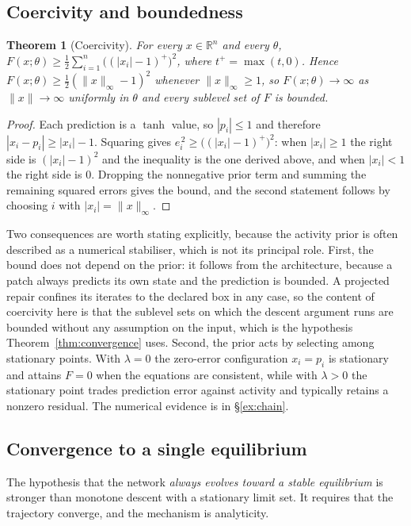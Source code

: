 \documentclass[11pt]{article}
\newtheorem{theorem}{Theorem}
\theoremstyle{definition}
\theoremstyle{remark}
\newcommand{\R}{\mathbb{R}}
\begin{document}
\subsection{Coercivity and boundedness}
\label{sec:coercive}
\begin{theorem}[Coercivity]
\label{thm:coercive}
For every $x\in\R^n$ and every $\theta$,
$F(x;\theta)\ge\tfrac12\sum_{i=1}^{n}\big((|x_i|-1)^+\big)^2$, where $t^+=\max(t,0)$. Hence
$F(x;\theta)\ge\tfrac12(\|x\|_\infty-1)^2$ whenever $\|x\|_\infty\ge1$, so $F(x;\theta)\to\infty$ as
$\|x\|\to\infty$ uniformly in $\theta$ and every sublevel set of $F$ is bounded.
\end{theorem}
\begin{proof}
Each prediction is a $\tanh$ value, so $|p_i|\le1$ and therefore $|x_i-p_i|\ge|x_i|-1$. Squaring gives
$e_i^{\,2}\ge\big((|x_i|-1)^+\big)^2$: when $|x_i|\ge1$ the right side is $(|x_i|-1)^2$ and the
inequality is the one derived above, and when $|x_i|<1$ the right side is $0$. Dropping the
nonnegative prior term and summing the remaining squared errors gives the bound, and the second
statement follows by choosing $i$ with $|x_i|=\|x\|_\infty$.
\end{proof}

Two consequences are worth stating explicitly, because the activity prior is often described as a
numerical stabiliser, which is not its principal role. First, the bound does not depend on the prior: it
follows from the architecture, because a patch always predicts its own state and the prediction is
bounded. A projected repair confines its iterates to the declared box in any case, so the content of
coercivity here is that the sublevel sets on which the descent argument runs are bounded without any
assumption on the input, which is the hypothesis Theorem~\ref{thm:convergence} uses. Second, the prior
acts by selecting among stationary points. With $\lambda=0$ the zero-error
configuration $x_i=p_i$ is stationary and attains $F=0$ when the equations are consistent, while with
$\lambda>0$ the stationary point trades prediction error against activity and typically retains a
nonzero residual. The numerical evidence is in \S\ref{ex:chain}.

\subsection{Convergence to a single equilibrium}
The hypothesis that the network \emph{always evolves toward a stable equilibrium} is stronger than
monotone descent with a stationary limit set. It requires that the trajectory converge, and the
mechanism is analyticity.
\end{document}

